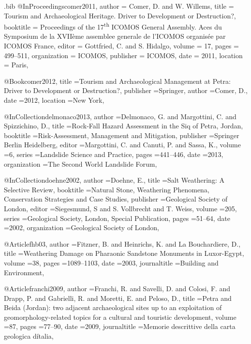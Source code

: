 \begin{filecontents}{\IJSRAidentifier.bib}
@InProceedings{comer2011,
  author       = {Comer, D. and W. Willems},
  title        = {Tourism and Archaeological Heritage. Driver to Development or Destruction?},
  booktitle    = {Proceedings of the 17\textsuperscript{th} ICOMOS General Assembly. Aces du Symposium de la XVIIème assemblee generale de l’ICOMOS organisée par ICOMOS France},
  editor       = {Gottfried, C. and S. Hidalgo},
  volume       = {17},
  pages        = {499--511},
  organization = {ICOMOS},
  publisher    = {ICOMOS},
  date         = {2011},
  location     = {Paris},
}

@Book{comer2012,
  title     ={Tourism and Archaeological Management at Petra: Driver to Development or Destruction?},
  publisher ={Springer},
  author    ={Comer, D.},
  date      ={2012},
  location  ={New York},
}

@InCollection{delmonaco2013,
	author       ={Delmonaco, G. and Margottini, C. and Spizzichino, D.},
	title        ={Rock-Fall Hazard Assessment in the Siq of Petra, Jordan},
	booktitle    ={Risk-Assessment, Management and Mitigation},
	publisher    ={Springer Berlin Heidelberg},
	editor       ={Margottini, C. and Canuti, P. and Sassa, K.},
	volume       ={6},
	series       ={Landslide Science and Practice},
	pages        ={441--446},
	date         ={2013},
	organization ={The Second World Landslide Forum},
}

@InCollection{doehne2002,
  author       ={Doehne, E.},
  title        ={Salt Weathering: A Selective Review},
  booktitle    ={Natural Stone, Weathering Phenomena, Conservation Strategies and Case Studies},
  publisher    ={Geological Society of London},
  editor       ={Siegesmund, S and  S. Vollbrecht and T. Weiss},
  volume       ={205},
  series       ={Geological Society, London, Special Publication},
  pages        ={51--64},
  date         ={2002},
  organization ={Geological Society of London},
}

@Article{fhb03,
  author       ={Fitzner, B. and Heinrichs, K. and La Bouchardiere, D.},
  title        ={Weathering Damage on Pharaonic Sandstone Monuments in Luxor-Egypt},
  volume       ={38},
  pages        ={1089--1103},
  date         ={2003},
  journaltitle ={Building and Environment},
}

@Article{franchi2009,
  author       ={Franchi, R. and Savelli, D. and Colosi, F. and Drapp, P. and Gabrielli, R. and Moretti, E. and Peloso, D.},
  title        ={Petra and Beida (Jordan): two adjacent archaeological sites up to an exploitation of geomorphology-related topics for a cultural and touristic development},
  volume       ={87},
  pages        ={77--90},
  date         ={2009},
  journaltitle ={Memorie descrittive della carta geologica dítalia},
}


\end{filecontents}
